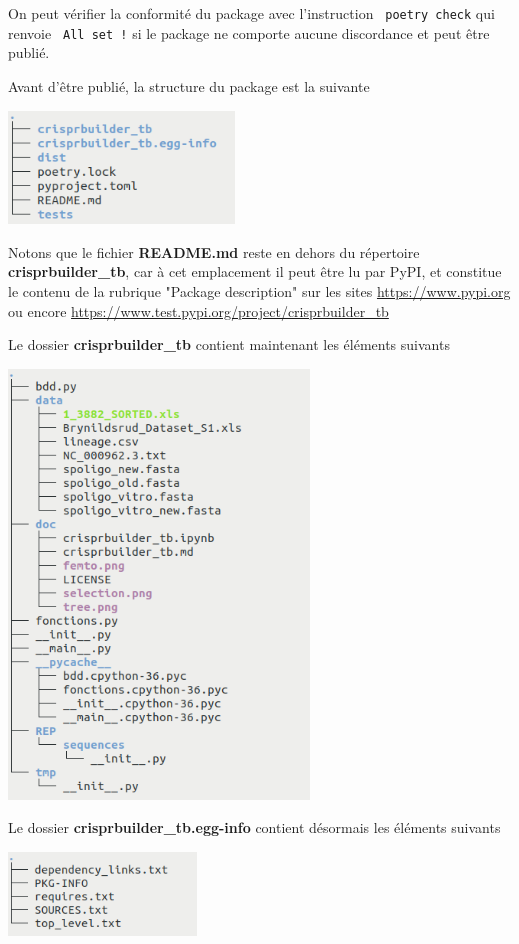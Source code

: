 \documentclass[twoside,a4paper,11pt,frenchb,openany]{report}
\begin{document}
On peut vérifier la conformité du package avec l’instruction
\texttt{ poetry check}
qui renvoie
\texttt{ All set !}
si le package ne comporte aucune discordance et peut être publié.

Avant d'être publié, la structure du package est la suivante

\includegraphics[width=6cm]{tree_level1.png}

Notons que le fichier \textbf{README.md} reste en dehors du répertoire \textbf{crisprbuilder\_tb}, car à cet emplacement il peut être lu par PyPI, et constitue le contenu de la rubrique "Package description" sur les sites \href{https://www.pypi.org}{https://www.pypi.org} ou encore \href{https://www.test.pypi.org/project/crisprbuilder\_tb}{https://www.test.pypi.org/project/crisprbuilder\_tb}

Le dossier \textbf{crisprbuilder\_tb} contient maintenant les éléments suivants

\includegraphics[width=8cm]{rep_crispr.png}

Le dossier \textbf{crisprbuilder\_tb.egg-info} contient désormais les éléments suivants

\includegraphics[width=5cm]{rep_crispr_egg.png}
\end{document}
